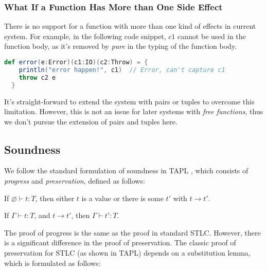 
\subsubsection{What If a Function Has More than One Side Effect}

There is no support for a function with more than one kind of effects
in current system. For example, in the following code snippet, $c1$
cannot be used in the function body, as it's removed by \emph{pure} in
the typing of the function body.

\begin{lstlisting}[language=Scala]
  def error(e:Error)(c1:IO)(c2:Throw) = {
    println("error happen!", c1)  // Error, can't capture c1
    throw c2 e
  }
\end{lstlisting}

It's straight-forward to extend the system with pairs or tuples to
overcome this limitation. However, this is not an issue for later
systems with \emph{free functions}, thus we don't pursue the extension
of pairs and tuples here.

\subsection{Soundness}

\label{sec:stlc-pure-soundness}

We follow the standard formulation of soundness in TAPL
\cite{bpierce2002types}, which consists of \emph{progress} and
\emph{preservation}, defined as follows:

\begin{theorem}[Progress]
If $\varnothing \vdash t : T$, then either $t$ is a value or there is some
$t'$ with $t \longrightarrow t'$.
\end{theorem}

\begin{theorem}[Preservation]
If $\Gamma \vdash t : T$, and $t \longrightarrow t'$, then $\Gamma
\vdash t' : T$.
\end{theorem}

The proof of progress is the same as the proof in standard
STLC. However, there is a significant difference in the proof of
preservation. The classic proof of preservation for STLC (as shown in
TAPL) depends on a substitution lemma, which is formulated as follows:

